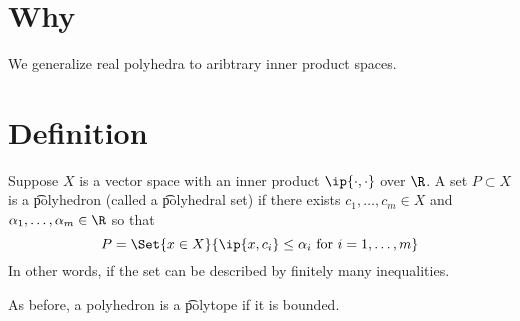
\section*{Why}

We generalize real polyhedra to aribtrary inner product spaces.

\section*{Definition}

Suppose $X$ is a vector space with an inner product $\ip{\cdot ,\cdot }$ over $\R $.
A set $P \subset X$ is a \t{polyhedron} (called a \t{polyhedral set}) if there exists $c_1, \dots , c_m \in X$ and $\alpha _1, \dots , \alpha _m \in \R $ so that
\[
P = \Set{x \in X}{\ip{x, c_i} \leq \alpha _i \text{ for } i = 1, \dots , m}
\]
In other words, if the set can be described by finitely many inequalities.

As before, a polyhedron is a \t{polytope} if it is bounded.

\blankpage